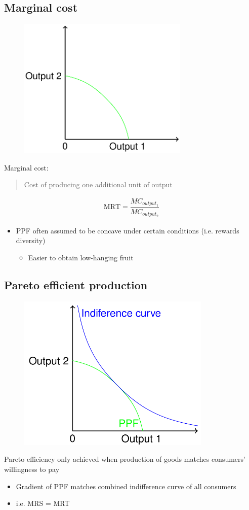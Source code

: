 \documentclass[class=report, crop=false, 12pt,a4paper]{standalone}
\begin{document}
\subsection{Marginal cost}
\begin{figure}[H]
	\centering
	\includegraphics[width =0.5 \textwidth]{../img/figure8.png}
	\caption{}
\end{figure}
Marginal cost:
\begin{quote}
	Cost of producing one additional unit of output
\end{quote}
\begin{gather}
	\textrm{MRT} = \dfrac{MC_{output_1}}{MC_{output_2}}
\end{gather}
\begin{itemize}
	\item PPF often assumed to be concave under certain conditions (i.e. rewards diversity)
	      \begin{itemize}
		      \item Easier to obtain low-hanging fruit
	      \end{itemize}
\end{itemize}
\subsection{Pareto efficient production}
\begin{figure}[H]
	\centering
	\includegraphics[width =0.5 \textwidth]{../img/figure9.png}
	\caption{}
\end{figure}
Pareto efficiency only achieved when production of goods matches consumers' willingness to pay
\begin{itemize}
	\item Gradient of PPF matches combined indifference curve of all consumers
	\item i.e. MRS = MRT
\end{itemize}
\end{document}
